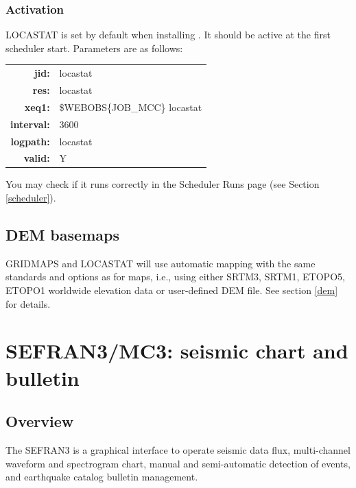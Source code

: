 \subsubsection{Activation}

LOCASTAT is set by default when installing \webobs. It should be active at the first scheduler start. Parameters are as follows:

\begin{tabular}{rl}
\textbf{jid:}      & locastat \\
\textbf{res:}      & locastat \\
\textbf{xeq1:}     & \$WEBOBS\{JOB\_MCC\} locastat \\
\textbf{interval:} & 3600 \\
\textbf{logpath:}  & locastat \\
\textbf{valid:}    & Y \\
\end{tabular}

You may check if it runs correctly in the Scheduler Runs page (see Section \ref{scheduler}).

\subsection{DEM basemaps}

GRIDMAPS and LOCASTAT will use automatic mapping with the same standards and options as for  maps, i.e., using either SRTM3, SRTM1, ETOPO5, ETOPO1 worldwide elevation data or user-defined DEM file. See section \ref{dem} for details.


\newpage
\section{SEFRAN3/MC3: seismic chart and bulletin}

\subsection{Overview}

The SEFRAN3 is a graphical interface to operate seismic data flux, multi-channel waveform and spectrogram chart, manual and semi-automatic detection of events, and earthquake catalog bulletin management.

